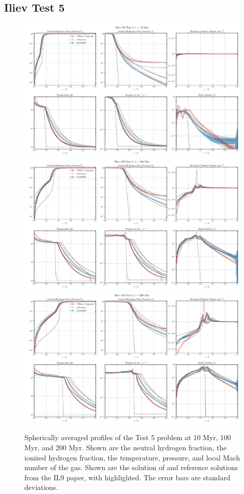 \subsection{Iliev Test 5}\label{chap:Iliev5}


\begin{figure}
\centering
\includegraphics[width=.8\textwidth]{figures/RHD/Iliev5/output_0001-Profiles.png}\\
\includegraphics[width=.8\textwidth]{figures/RHD/Iliev5/output_0010-Profiles.png}\\
\includegraphics[width=.8\textwidth]{figures/RHD/Iliev5/output_0020-Profiles.png}
\caption{
Spherically averaged profiles of the Test 5 problem at 10 Myr, 100 Myr, and 200 Myr. Shown are the
neutral hydrogen fraction, the ionized hydrogen fraction, the temperature, pressure, and local Mach
number of the gas. Shown are the solution of \GEARRT and reference solutions from the IL9 paper,
with  highlighted. The error bars are standard deviations.
}
\label{fig:iliev5}
\end{figure}



